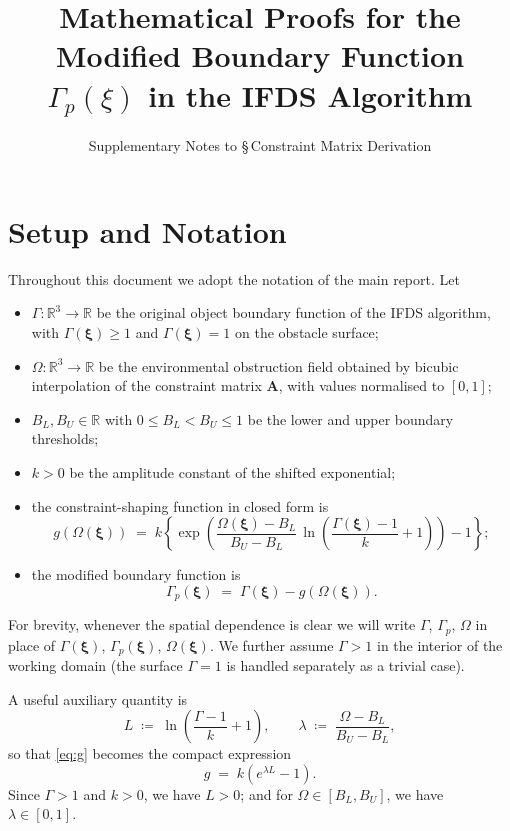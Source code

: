 \documentclass[11pt]{article}
\title{Mathematical Proofs for the Modified Boundary Function $\Gamma_p(\xi)$ in the IFDS Algorithm}
\author{Supplementary Notes to \S\,Constraint Matrix Derivation}
\date{}
\theoremstyle{remark}
\newcommand{\R}{\mathbb{R}}
\newcommand{\G}{\Gamma}
\newcommand{\Gp}{\Gamma_p}
\newcommand{\Om}{\Omega}
\newcommand{\xib}{\bm{\xi}}
\begin{document}
\maketitle

\section*{Setup and Notation}

Throughout this document we adopt the notation of the main report. Let
\begin{itemize}
    \item $\G:\R^3\to\R$ be the original object boundary function of the IFDS algorithm, with $\G(\xib)\ge 1$ and $\G(\xib)=1$ on the obstacle surface;
    \item $\Om:\R^3\to\R$ be the environmental obstruction field obtained by bicubic interpolation of the constraint matrix $\mathbf{A}$, with values normalised to $[0,1]$;
    \item $B_L,B_U\in\R$ with $0\le B_L<B_U\le 1$ be the lower and upper boundary thresholds;
    \item $k>0$ be the amplitude constant of the shifted exponential;
    \item the constraint-shaping function in closed form is
    \begin{equation}
    \label{eq:g}
        g(\Om(\xib)) \;=\; k\left\{\exp\!\left(\frac{\Om(\xib)-B_L}{B_U-B_L}\,
        \ln\!\left(\frac{\G(\xib)-1}{k}+1\right)\right)-1\right\};
    \end{equation}
    \item the modified boundary function is
    \begin{equation}
    \label{eq:Gp}
        \Gp(\xib) \;=\; \G(\xib) - g(\Om(\xib)).
    \end{equation}
\end{itemize}
For brevity, whenever the spatial dependence is clear we will write $\G$, $\Gp$, $\Om$ in place of $\G(\xib)$, $\Gp(\xib)$, $\Om(\xib)$. We further assume $\G>1$ in the interior of the working domain (the surface $\G=1$ is handled separately as a trivial case).

A useful auxiliary quantity is
\begin{equation}
    \label{eq:L_lambda}
    L \;\coloneqq\; \ln\!\left(\frac{\G-1}{k}+1\right),
    \qquad
    \lambda \;\coloneqq\; \frac{\Om-B_L}{B_U-B_L},
\end{equation}
so that \eqref{eq:g} becomes the compact expression
\begin{equation}
    \label{eq:g_compact}
    g \;=\; k\left(e^{\lambda L}-1\right).
\end{equation}
Since $\G>1$ and $k>0$, we have $L>0$; and for $\Om\in[B_L,B_U]$, we have $\lambda\in[0,1]$.
\end{document}
